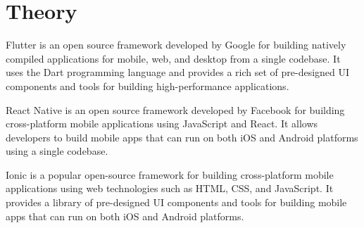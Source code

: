 \section{Theory}
Flutter is an open source framework developed by Google for building natively compiled applications for mobile, web, and desktop from a single codebase. \cite{bib:most-popular-mobile-frameworks-2024}
It uses the Dart programming language and provides a rich set of pre-designed UI components and tools for building high-performance applications.

React Native is an open source framework developed by Facebook for building cross-platform mobile applications using JavaScript and React.
It allows developers to build mobile apps that can run on both iOS and Android platforms using a single codebase. \cite{bib:most-popular-mobile-frameworks-2024}

Ionic is a popular open-source framework for building cross-platform mobile applications using web technologies such as HTML, CSS, and JavaScript.
It provides a library of pre-designed UI components and tools for building mobile apps that can run on both iOS and Android platforms. \cite{bib:most-popular-mobile-frameworks-2024}

